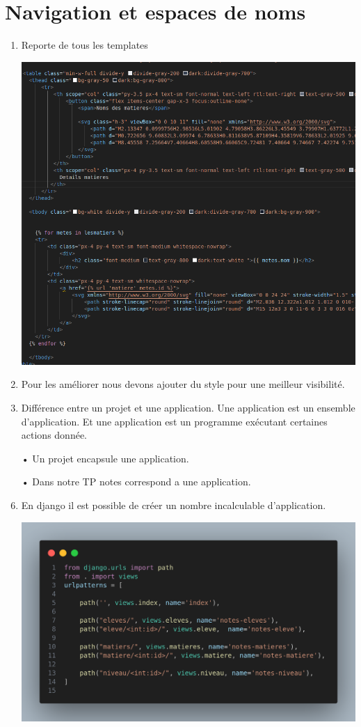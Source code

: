 \documentclass[10pt,a4paper]{article}
\begin{document}
\section{Navigation et espaces de noms}
\begin{enumerate}
\item Reporte de tous les templates\\
\begin{center}
\includegraphics[scale=0.4]{tab.png}
\end{center}

\item Pour les améliorer nous devons ajouter du style pour une meilleur visibilité.

\item Différence entre un projet et une application. Une application est un ensemble d'application. Et une application est un programme exécutant certaines actions donnée.
\item[•] Un projet encapsule une application.
\item[•] Dans notre TP notes correspond a une application.


\item En django il est possible de créer un nombre incalculable d'application.

\begin{center}
\includegraphics[scale=0.3]{10.png}
\end{center}






\end{enumerate}
\end{document}
